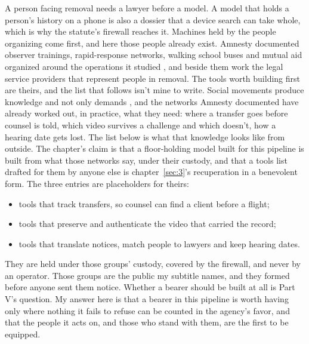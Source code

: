 A person facing removal needs a lawyer before a model. A model that holds a person's history on a phone is also a dossier that a device search can take whole, which is why the statute's firewall reaches it. Machines held by the people organizing come first, and here those people already exist. Amnesty documented observer trainings, rapid-response networks, walking school buses and mutual aid organized around the operations it studied \autocite{Amnesty2026Whistles}, and beside them work the legal service providers that represent people in removal. The tools worth building first are theirs, and the list that follows isn't mine to write. Social movements produce knowledge and not only demands \autocite{kelley2002freedom}, and the networks Amnesty documented have already worked out, in practice, what they need: where a transfer goes before counsel is told, which video survives a challenge and which doesn't, how a hearing date gets lost. The list below is what that knowledge looks like from outside. The chapter's claim is that a floor-holding model built for this pipeline is built from what those networks say, under their custody, and that a tools list drafted for them by anyone else is chapter~\ref{sec:3}'s recuperation in a benevolent form. The three entries are placeholders for theirs:

\begin{itemize}
\item tools that track transfers, so counsel can find a client before a flight;
\item tools that preserve and authenticate the video that carried the record;
\item tools that translate notices, match people to lawyers and keep hearing dates.
\end{itemize}

They are held under those groups' custody, covered by the firewall, and never by an operator. Those groups are the public my subtitle names, and they formed before anyone sent them notice. Whether a bearer should be built at all is Part V's question. My answer here is that a bearer in this pipeline is worth having only where nothing it fails to refuse can be counted in the agency's favor, and that the people it acts on, and those who stand with them, are the first to be equipped.
